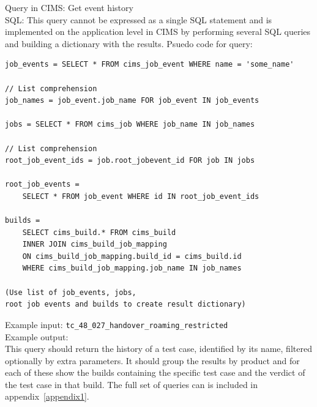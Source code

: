 \label{q:tchistory}
Query in CIMS: Get event history \\
SQL: This query cannot be expressed as a single SQL statement and is implemented on the application level in CIMS by performing several SQL queries and building a dictionary with the results. Psuedo code for query:
\begin{verbatim}
job_events = SELECT * FROM cims_job_event WHERE name = 'some_name'

// List comprehension
job_names = job_event.job_name FOR job_event IN job_events 

jobs = SELECT * FROM cims_job WHERE job_name IN job_names

// List comprehension
root_job_event_ids = job.root_jobevent_id FOR job IN jobs

root_job_events = 
    SELECT * FROM job_event WHERE id IN root_job_event_ids

builds = 
    SELECT cims_build.* FROM cims_build
    INNER JOIN cims_build_job_mapping
    ON cims_build_job_mapping.build_id = cims_build.id
    WHERE cims_build_job_mapping.job_name IN job_names

(Use list of job_events, jobs, 
root job events and builds to create result dictionary)

\end{verbatim}
Example input: {\tt tc\_48\_027\_handover\_roaming\_restricted } \\
Example output: \\
This query should return the history of a test case, identified by its name, filtered optionally by extra parameters. It should group the results by product and for each of these show the builds containing the specific test case and the verdict of the test case in that build. The full set of queries can is included in appendix~\ref{appendix1}.



